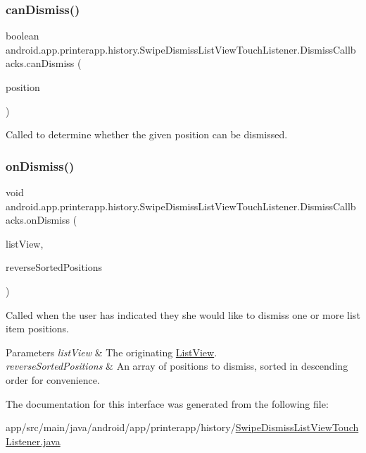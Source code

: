 \subsubsection{\texorpdfstring{can\+Dismiss()}{canDismiss()}}
{\footnotesize\ttfamily boolean android.\+app.\+printerapp.\+history.\+Swipe\+Dismiss\+List\+View\+Touch\+Listener.\+Dismiss\+Callbacks.\+can\+Dismiss (\begin{DoxyParamCaption}\item[{int}]{position }\end{DoxyParamCaption})}

Called to determine whether the given position can be dismissed. \mbox{\label{interfaceandroid_1_1app_1_1printerapp_1_1history_1_1_swipe_dismiss_list_view_touch_listener_1_1_dismiss_callbacks_a8a4657354a9b07d66103806d51a91ec0}} 
\subsubsection{\texorpdfstring{on\+Dismiss()}{onDismiss()}}
{\footnotesize\ttfamily void android.\+app.\+printerapp.\+history.\+Swipe\+Dismiss\+List\+View\+Touch\+Listener.\+Dismiss\+Callbacks.\+on\+Dismiss (\begin{DoxyParamCaption}\item[{List\+View}]{list\+View,  }\item[{int \mbox{[}$\,$\mbox{]}}]{reverse\+Sorted\+Positions }\end{DoxyParamCaption})}

Called when the user has indicated they she would like to dismiss one or more list item positions.


\begin{DoxyParams}{Parameters}
{\em list\+View} & The originating \hyperlink{}{List\+View}. \\
\hline
{\em reverse\+Sorted\+Positions} & An array of positions to dismiss, sorted in descending order for convenience. \\
\hline
\end{DoxyParams}


The documentation for this interface was generated from the following file\+:\begin{DoxyCompactItemize}
\item 
app/src/main/java/android/app/printerapp/history/\hyperlink{_swipe_dismiss_list_view_touch_listener_8java}{Swipe\+Dismiss\+List\+View\+Touch\+Listener.\+java}\end{DoxyCompactItemize}
